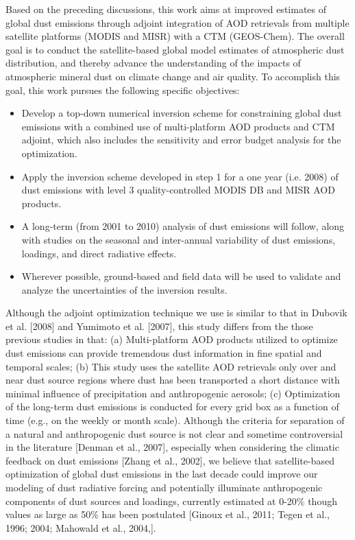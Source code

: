  Based on the preceding discussions, this work aims at improved estimates of 
 global dust emissions through adjoint integration of AOD retrievals 
 from multiple satellite platforms (MODIS and MISR) with a CTM (GEOS-Chem). 
 The overall goal is to conduct the satellite-based global model estimates 
 of atmospheric dust distribution, and thereby advance the understanding of 
 the impacts of atmospheric mineral dust on climate change and air quality. 
 To accomplish this goal, this work pursues the following specific objectives:
 \begin{itemize}
 \item Develop a top-down numerical inversion scheme for constraining global dust emissions with a combined use of multi-platform AOD products and CTM adjoint, which also includes the sensitivity and error budget analysis for the optimization.
 \item Apply the inversion scheme developed in step 1 for a one year (i.e. 2008) of dust emissions with level 3 quality-controlled MODIS DB and MISR AOD products.
 \item A long-term (from 2001 to 2010) analysis of dust emissions will follow, along with studies on the seasonal and inter-annual variability of dust emissions, loadings, and direct radiative effects.
 \item Wherever possible, ground-based and field data will be used to validate and analyze the uncertainties of the inversion results.
 \end{itemize}
Although the adjoint optimization technique we use is similar to that in Dubovik et
al. [2008] and Yumimoto et al. [2007], this study differs from the those previous studies in that: (a) Multi-platform AOD products utilized to optimize dust emissions can provide tremendous dust information in fine spatial and temporal scales; (b) This study uses the satellite AOD retrievals only over and near dust source regions where dust has been transported a short distance with minimal influence of precipitation and anthropogenic
aerosols; (c) Optimization of the long-term dust emissions is conducted for every grid box as a function of time (e.g., on the weekly or month scale). Although the criteria for separation of a natural and anthropogenic dust source is not clear and sometime controversial in the literature [Denman et al., 2007], especially when considering the climatic feedback on dust emissions [Zhang et al., 2002], we believe that satellite-based optimization of global dust emissions in the last decade could improve our modeling of dust radiative forcing and potentially illuminate anthropogenic components of dust sources and loadings, currently estimated at 0-20\% though values as large as 50\% has been postulated [Ginoux et al., 2011; Tegen et al., 1996; 2004; Mahowald et al., 2004,].

